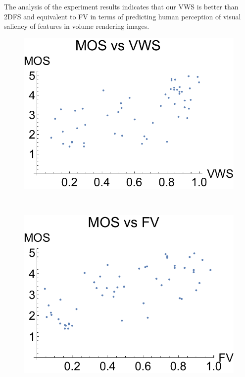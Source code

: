 The analysis of the experiment results indicates that our VWS is better than 2DFS and equivalent to FV in terms of predicting human perception of visual saliency of features in volume rendering images.

\begin{figure}
	\centering
	\begin{minipage}{.33\textwidth}
		\includegraphics[width=1\linewidth]{figures/mos_vs_vws}
	\end{minipage}~
	\begin{minipage}{.33\textwidth}
		\includegraphics[width=1\linewidth]{figures/mos_vs_visibility}

\end{minipage}
\end{figure}
